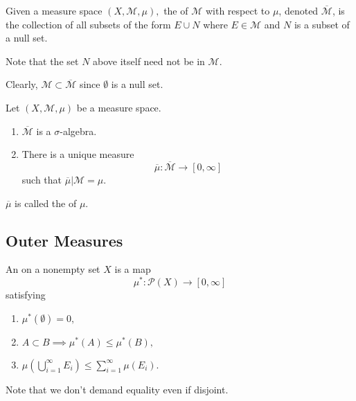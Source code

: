 \documentclass[12pt]{article}	%
\begin{document}
\begin{defn}[Completion]
	Given a measure space $(X, \mathcal{M}, \mu),$ the  of $\mathcal{M}$ with respect to $\mu$, denoted $\overline{\mathcal{M}}$, is the collection of all subsets of the form $E \cup N$ where $E \in \mathcal{M}$ and $N$ is a subset of a null set. 
\end{defn}
Note that the set $N$ above itself need not be in $\mathcal{M}$.

Clearly, $\mathcal{M} \subset \overline{\mathcal{M}}$ since $\emptyset$ is a null set.

\begin{prop}
	Let $(X, \mathcal{M}, \mu)$ be a measure space.
	\begin{enumerate}
		\item $\overline{\mathcal{M}}$ is a $\sigma$-algebra.
		\item There is a unique measure
		\begin{equation*} 
			\overline{\mu} : \overline{\mathcal{M}} \to [0, \infty]
		\end{equation*}
		such that $\overline{\mu}|\mathcal{M} = \mu.$
	\end{enumerate}
	$\overline{\mu}$ is called the  of $\mu$.
\end{prop}

\subsection{Outer Measures}

\begin{defn}
	An  on a nonempty set $X$ is a map
	\begin{equation*} 
		\mu^* : \mathcal{P}(X) \to [0, \infty]
	\end{equation*}
	satisfying
	\begin{enumerate}
		\item $\mu^*(\emptyset) = 0,$
		\item $A \subset B \implies \mu^*(A) \le \mu^*(B),$
		\item $\mu\left(\bigcup_{i = 1}^\infty E_i\right) \le \sum_{i = 1}^{\infty} \mu(E_i).$
	\end{enumerate}
\end{defn}
Note that we don't demand equality even if disjoint.
\end{document}
